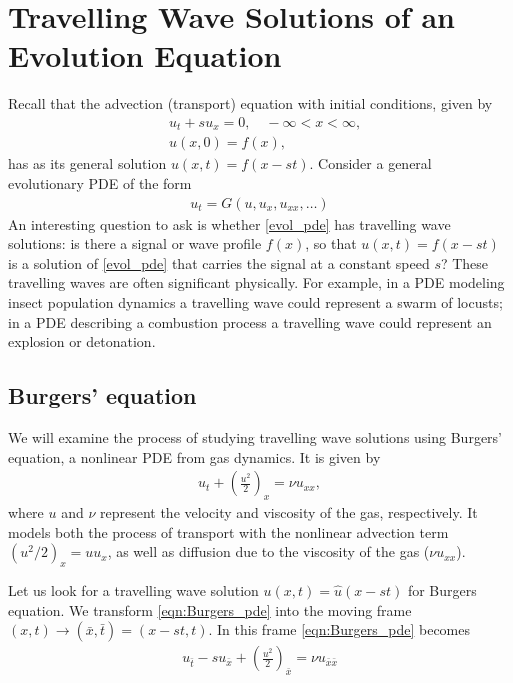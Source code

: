 \section*{Travelling Wave Solutions of an Evolution Equation}
Recall that the advection (transport) equation with initial conditions, given by
\begin{align*}
	&{ }u_t + su_x  = 0, \quad -\infty < x < \infty, \\
	&{ }u(x,0) = f(x),
\end{align*}
has as its general solution $u(x,t) = f(x -st)$.
Consider a general evolutionary PDE of the form
\begin{align}
u_t = G(u,u_x, u_{xx}, \ldots)
\label{evol_pde}
\end{align}
An interesting question to ask is whether \eqref{evol_pde} has travelling wave solutions: is there a signal or wave profile $f(x)$, so that $u(x,t) = f(x-st)$ is a solution of \eqref{evol_pde} that carries the signal at a constant speed $s$?
These travelling waves are often significant physically.
For example, in a PDE modeling insect population dynamics a travelling wave could represent a swarm of locusts; in a PDE describing a combustion process a travelling wave could represent an explosion or detonation.

\subsection*{Burgers' equation}
We will examine the process of studying travelling wave solutions using Burgers' equation, a nonlinear PDE from gas dynamics.
It is given by
\begin{align}
	u_t + \left( \frac{u^2}{2} \right)_x = \nu u_{xx}, \label{eqn:Burgers_pde}
\end{align}
where $u$ and $\nu$ represent the velocity and viscosity of the gas, respectively.
It models both the process of transport with the nonlinear advection term $(u^2/2)_x = u u_x$, as well as diffusion due to the viscosity of the gas ($\nu u_{xx}$).

Let us look for a travelling wave solution $u(x,t) = \hat{u}(x-st)$ for Burgers equation.
We transform \eqref{eqn:Burgers_pde} into the moving frame $(x,t) \to (\bar{x},\bar{t}) = (x-st, t)$. In this frame \eqref{eqn:Burgers_pde} becomes
\begin{align}
	u_{\bar{t}} - s u_{\bar{x}}+ \left(\frac{u^2}{2} \right)_{\bar{x}} = \nu u_{\bar{x}\bar{x}}
	\label{eqn:Burgers_pde_moving_frame}
\end{align}

